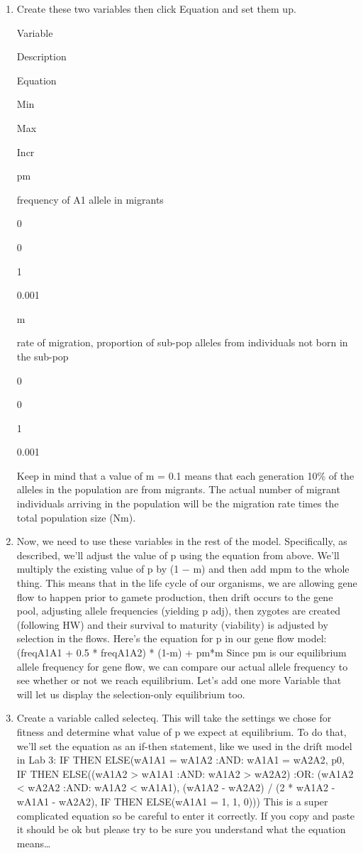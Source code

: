 \begin{enumerate}
\def\labelenumi{\arabic{enumi}.}
\item
  Create these two variables then click Equation and set them up.

  Variable

  Description

  Equation

  Min

  Max

  Incr

  pm

  frequency of A1 allele in migrants

  0

  0

  1

  0.001

  m

  rate of migration, proportion of sub-pop alleles from individuals not
  born in the sub-pop

  0

  0

  1

  0.001

  Keep in mind that a value of m = 0.1 means that each generation 10\%
  of the alleles in the population are from migrants. The actual number
  of migrant individuals arriving in the population will be the
  migration rate times the total population size (Nm).
\item
  Now, we need to use these variables in the rest of the model.
  Specifically, as described, we'll adjust the value of p using the
  equation from above. We'll multiply the existing value of p by (1 − m)
  and then add mpm to the whole thing. This means that in the life cycle
  of our organisms, we are allowing gene flow to happen prior to gamete
  production, then drift occurs to the gene pool, adjusting allele
  frequencies (yielding p adj), then zygotes are created (following HW)
  and their survival to maturity (viability) is adjusted by selection in
  the flows. Here's the equation for p in our gene flow model: (freqA1A1
  + 0.5 * freqA1A2) * (1-m) + pm*m Since pm is our equilibrium allele
  frequency for gene flow, we can compare our actual allele frequency to
  see whether or not we reach equilibrium. Let's add one more Variable
  that will let us display the selection-only equilibrium too.
\item
  Create a variable called selecteq. This will take the settings we
  chose for fitness and determine what value of p we expect at
  equilibrium. To do that, we'll set the equation as an if-then
  statement, like we used in the drift model in Lab 3: IF THEN
  ELSE(wA1A1 = wA1A2 :AND: wA1A1 = wA2A2, p0, IF THEN ELSE((wA1A2
  \textgreater{} wA1A1 :AND: wA1A2 \textgreater{} wA2A2) :OR: (wA1A2
  \textless{} wA2A2 :AND: wA1A2 \textless{} wA1A1), (wA1A2 - wA2A2) / (2
  * wA1A2 - wA1A1 - wA2A2), IF THEN ELSE(wA1A1 = 1, 1, 0))) This is a
  super complicated equation so be careful to enter it correctly. If you
  copy and paste it should be ok but please try to be sure you
  understand what the equation means\ldots{}


\end{enumerate}
